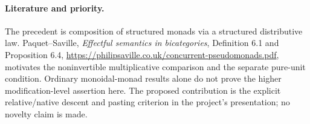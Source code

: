 \documentclass[11pt]{article}
\begin{document}
\paragraph{Literature and priority.} The precedent is composition of structured monads via a structured distributive law. Paquet--Saville, \emph{Effectful semantics in bicategories}, Definition 6.1 and Proposition 6.4, \url{https://philipsaville.co.uk/concurrent-pseudomonads.pdf}, motivates the noninvertible multiplicative comparison and the separate pure-unit condition. Ordinary monoidal-monad results alone do not prove the higher modification-level assertion here. The proposed contribution is the explicit relative/native descent and pasting criterion in the project's presentation; no novelty claim is made.
\end{document}
